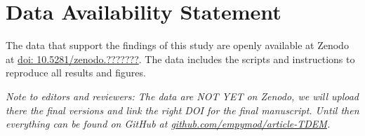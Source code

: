 \documentclass[
    manuscript,
  ]{geophysics}
\begin{document}
\section{Data Availability Statement}

The data that support the findings of this study are openly available at Zenodo
at \href{https://zenodo.org/badge/DOI/10.5281/zenodo.???????}{doi:
10.5281/zenodo.???????}. The data includes the scripts and instructions to
reproduce all results and figures.

\emph{Note to editors and reviewers: The data are NOT YET on Zenodo, we will
  upload there the final versions and link the right DOI for the final
  manuscript. Until then everything can be found on GitHub at
  \href{https://github.com/empymod/article-TDEM}%
  {github.com/empymod/article-TDEM}.}



\end{document}
